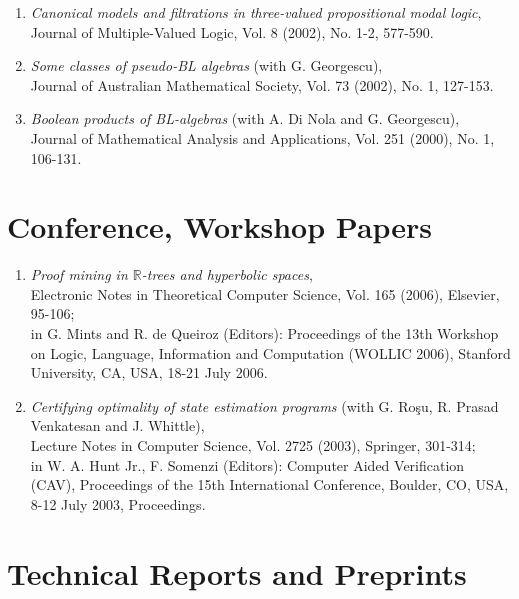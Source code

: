 \documentclass[12pt]{article}
\begin{document}
\begin{enumerate}
\item\label{3-modal} {\em Canonical models and filtrations in three-valued propositional modal logic}, \\
Journal of Multiple-Valued Logic, Vol. 8 (2002), No. 1-2, 577-590.

\item \label{classes-psBL} {\em Some classes of pseudo-BL algebras} (with  G. Georgescu), \\
Journal of Australian Mathematical Society, Vol. 73 (2002), No. 1, 127-153.

\item \label{Boolean-prod} {\em Boolean products of BL-algebras} (with A. Di Nola and G. Georgescu),\\
Journal of Mathematical Analysis and Applications, Vol. 251 (2000), No. 1, 106-131.


\end{enumerate}


\section{Conference, Workshop Papers}\label{conf}


\begin{enumerate}

\item \label{R-trees-hyp-spaces}
 {\em Proof mining in ${\mathbb R}$-trees and hyperbolic spaces},\\
Electronic Notes in Theoretical Computer Science, Vol. 165 (2006), Elsevier, 95-106;\\
in G. Mints and R. de Queiroz (Editors): Proceedings of the 13th Workshop on Logic, Language, 
Information and Computation (WOLLIC 2006), Stanford University, CA, USA, 18-21 July 2006.

\item \label{CAV}{\em Certifying optimality of state estimation programs} (with  
G. Ro\c su, R. Prasad Venkatesan  and J. Whittle),\\
Lecture Notes in Computer Science, Vol. 2725 (2003), Springer, 301-314;\\
in W. A. Hunt Jr., F. Somenzi (Editors): Computer Aided Verification (CAV), Proceedings of the 15th 
International Conference, Boulder, CO, USA, 8-12 July 2003, Proceedings.


\end{enumerate}

\section{Technical Reports and Preprints}\label{other}
\end{document}
